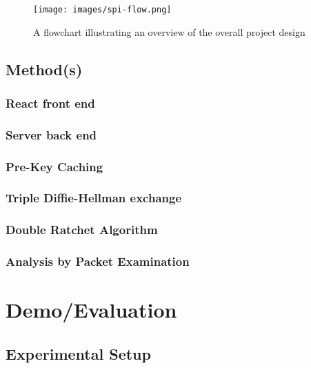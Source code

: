 \documentclass[12pt]{article}
\begin{document}
\begin{figure}[h!]
    \centering
    \texttt{[image: images/spi-flow.png]}
    \caption{A flowchart illustrating an overview of the overall project design}
    \label{fig:my_label5}
\end{figure}

\newpage
\subsection{Method(s)}
\subsubsection{React front end}
\subsubsection{Server back end}
\subsubsection{Pre-Key Caching}
\subsubsection{Triple Diffie-Hellman exchange}
\subsubsection{Double Ratchet Algorithm}
\subsubsection{Analysis by Packet Examination}

\newpage
\section{Demo/Evaluation}
\subsection{Experimental Setup}
\par %
\end{document}
